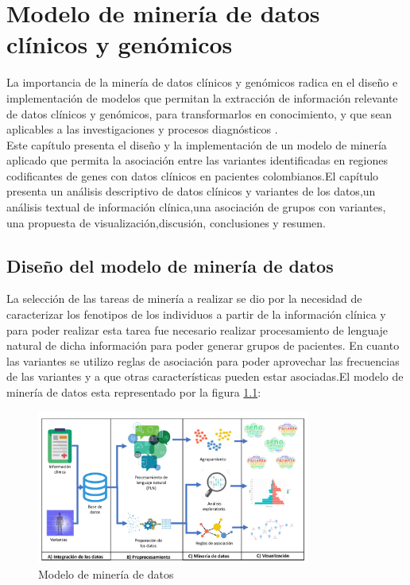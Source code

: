 \chapter{Modelo de minería de datos clínicos y genómicos}

La importancia de la minería de datos clínicos y genómicos radica en el diseño e implementación de modelos que permitan la extracción de información relevante de datos clínicos y genómicos, para transformarlos en conocimiento, y que sean aplicables a las investigaciones y procesos diagnósticos \cite{Farid2016}. \\  

Este capítulo presenta el diseño y la implementación de un modelo de minería aplicado que permita la asociación entre las variantes identificadas en regiones codificantes de genes con datos clínicos en pacientes colombianos.El capítulo presenta un análisis descriptivo de datos clínicos y variantes de los datos,un análisis textual de información clínica,una asociación de grupos con variantes, una propuesta de visualización,discusión, conclusiones y resumen. 

\section{Diseño del modelo de minería de datos}

La selección de las tareas de minería a realizar se dio por la necesidad de caracterizar los fenotipos de los individuos a partir de la información clínica y para poder realizar esta tarea fue necesario realizar procesamiento de lenguaje natural de dicha información para poder generar grupos de pacientes. En cuanto las variantes se utilizo reglas de asociación para poder aprovechar las frecuencias de las variantes y a que otras características pueden estar asociadas.El modelo de minería de datos esta representado por la figura  \ref{fig:kdd}:\\

\begin{figure}[H]
	\centering
	\includegraphics[width=0.8\textwidth]{Kap4/KDDtesis.pdf}
	\caption{Modelo de minería de datos}
	\label{fig:kdd}
\end{figure}


